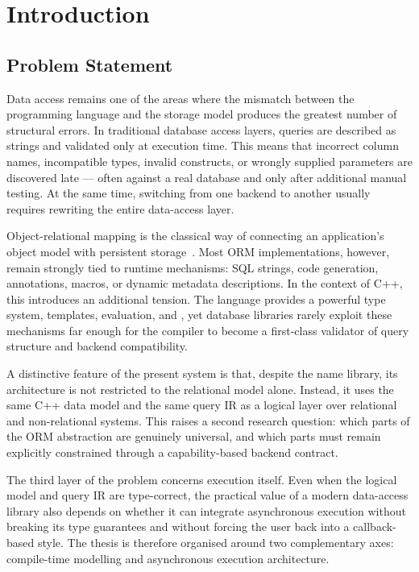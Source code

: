 \section{Introduction}
\label{sec:introduction}

\subsection{Problem Statement}

Data access remains one of the areas where the mismatch between the programming language and the storage model produces the greatest number of structural errors. In traditional database access layers, queries are described as strings and validated only at execution time. This means that incorrect column names, incompatible types, invalid  constructs, or wrongly supplied parameters are discovered late --- often against a real database and only after additional manual testing. At the same time, switching from one backend to another usually requires rewriting the entire data-access layer.

Object-relational mapping is the classical way of connecting an application's object model with persistent storage~\cite{fowler2002}. Most ORM implementations, however, remain strongly tied to runtime mechanisms: SQL strings, code generation, annotations, macros, or dynamic metadata descriptions. In the context of C++, this introduces an additional tension. The language provides a powerful type system, templates,  evaluation, and , yet database libraries rarely exploit these mechanisms far enough for the compiler to become a first-class validator of query structure and backend compatibility.

A distinctive feature of the present system is that, despite the name \ORMName{} library, its architecture is not restricted to the relational model alone. Instead, it uses the same C++ data model and the same query IR as a logical layer over relational and non-relational systems. This raises a second research question: which parts of the ORM abstraction are genuinely universal, and which parts must remain explicitly constrained through a capability-based backend contract.

The third layer of the problem concerns execution itself. Even when the logical model and query IR are type-correct, the practical value of a modern data-access library also depends on whether it can integrate asynchronous execution without breaking its type guarantees and without forcing the user back into a callback-based style. The thesis is therefore organised around two complementary axes: compile-time modelling and asynchronous execution architecture.

